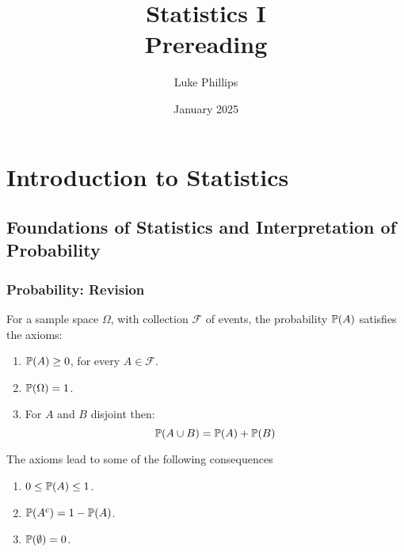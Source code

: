 \documentclass[10pt, a4paper]{article}
\title{Statistics I \\
    \large Prereading}
\author{Luke Phillips}
\date{January 2025}
\begin{document}
\maketitle

\newpage

\tableofcontents

\newpage

\section{Introduction to Statistics}

\subsection{Foundations of Statistics and Interpretation of Probability}

\subsubsection{Probability: Revision}

\begin{definition}
    For a sample space $\Omega$,
    with collection $\mathcal{F}$ of events,
    the probability $\P(A)$ satisfies the axioms:
    \begin{enumerate}[label = A\arabic*]
        \item $\P(A) \geq 0$,
        for every $A \in \mathcal{F}$.

        \item $\P(\Omega) = 1$.

        \item For $A$ and $B$ disjoint then:
        \[
        \P(A \cup B) = \P(A) + \P(B)
        \]
    \end{enumerate}
\end{definition}

The axioms lead to some of the following consequences
\begin{proposition}
    \begin{enumerate}[label = (\roman*)]
        \item $0 \leq \P(A) \leq 1$.
        
        \item $\P(A ^ c) = 1 - \P(A)$.
        
        \item $\P(\emptyset) = 0$.
    \end{enumerate}
\end{proposition}
\end{document}

